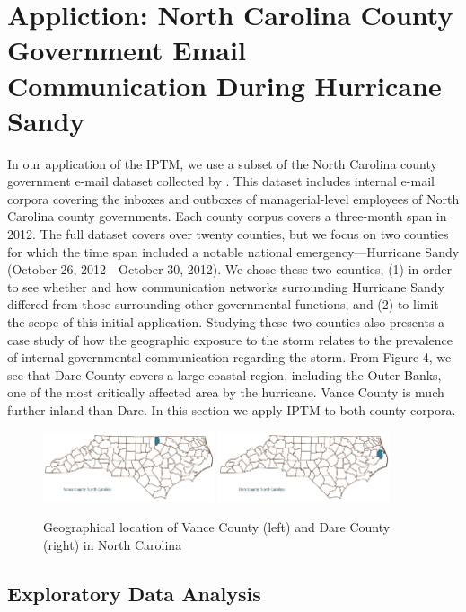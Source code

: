 \documentclass[a4paper]{article}
\begin{document}
 \section{Appliction: North Carolina County Government Email \\ Communication During Hurricane Sandy}  \label{sec: Application to North Carolina email data}
In our application of the IPTM, we use a subset of the North Carolina county government e-mail dataset collected by \citet{ben2017transparency}. This dataset includes internal e-mail corpora covering the inboxes and outboxes of managerial-level employees of North Carolina county governments. Each county corpus covers a three-month span in 2012. The full dataset covers over twenty counties, but we focus on two counties for which the time span included a notable national emergency---Hurricane Sandy (October 26, 2012---October 30, 2012). We chose these two counties, (1) in order to see whether and how communication networks surrounding Hurricane Sandy differed from those surrounding other governmental functions, and (2) to limit the scope of this initial application. Studying these two counties also presents a case study of how the geographic exposure to the storm relates to the prevalence of internal governmental communication regarding the storm. From Figure 4, we see that Dare County covers a large coastal region, including the Outer Banks, one of the most critically affected area by the hurricane. Vance County is much further inland than Dare. In this section we apply IPTM to both county corpora.
  \begin{figure}[ht]
  	\centering
  	\includegraphics[width=0.45\textwidth]{plots/Vance.png} 
  	     	\includegraphics[width=0.45\textwidth]{plots/Dare.png} 
  	\label{fig:VanceDare}
  	\caption{Geographical location of Vance County (left) and Dare County (right) in North Carolina}
  \end{figure}
 \subsection{Exploratory Data Analysis} \label{subsec: EDA}
 
\end{document}

